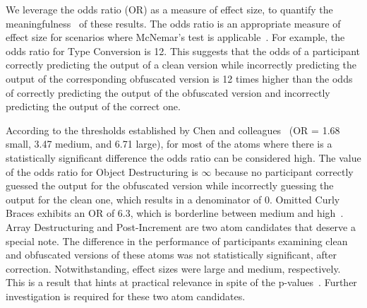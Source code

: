 We leverage the odds ratio (OR) as a measure of effect size, to quantify the meaningfulness~\cite{Ellis:2010:EGE} of these results. The odds ratio is an appropriate measure of effect size for scenarios where McNemar's test is applicable~\cite{Mangiafico:2016:SAE}. For example, the odds ratio for Type Conversion is 12. This suggests that the odds of a participant correctly predicting the output of a clean version while incorrectly predicting the output of the corresponding obfuscated version is 12 times higher than the odds of correctly predicting the output of the obfuscated version and incorrectly predicting the output of the correct one. 

According to the thresholds established by Chen and colleagues~\cite{Chen:2010:HBB} (OR = 1.68 small, 3.47 medium, and 6.71 large), for most of the atoms where there is a statistically significant difference the odds ratio can be considered high. The value of the odds ratio for Object Destructuring is $\infty$ because no participant correctly guessed the output for the obfuscated version while incorrectly guessing the output for the clean one, which results in a denominator of 0. Omitted Curly Braces exhibits an OR of 6.3, which is borderline between medium and high~\cite{Chen:2010:HBB}. Array Destructuring and Post-Increment are two atom candidates that deserve a special note. The difference in the performance of participants examining clean and obfuscated versions of these atoms was not statistically significant, after correction. Notwithstanding, effect sizes were large and medium, respectively. This is a result that hints at practical relevance in spite of the p-values~\cite{Ellis:2010:EGE}. Further investigation is required for these two atom candidates.

